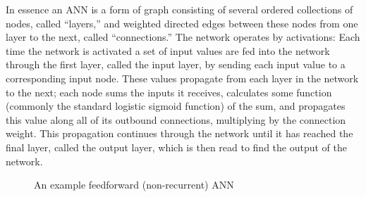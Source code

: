 \documentclass[ author={Stephen Livermore-Tozer},
				supervisor={Dr. Peter Flach},
				degree={MEng},
				title={Algorithmic Co-composition Using Machine Learning},
				subtitle={},
				type={research},
				year={2016} ]{dissertation}
\begin{document}
	In essence an ANN is a form of graph consisting of several ordered collections of nodes, called ``layers,'' and weighted directed edges between these nodes from one layer to the next, called ``connections.'' The network operates by activations: Each time the network is activated a set of input values are fed into the network through the first layer, called the input layer, by sending each input value to a corresponding input node. These values propagate from each layer in the network to the next; each node sums the inputs it receives, calculates some function (commonly the standard logistic sigmoid function) of the sum, and propagates this value along all of its outbound connections, multiplying by the connection weight. This propagation continues through the network until it has reached the final layer, called the output layer, which is then read to find the output of the network.
	
	\begin{figure}[!ht]
		\centering
		\caption{An example feedforward (non-recurrent) ANN}
	\end{figure}
	
\end{document}
